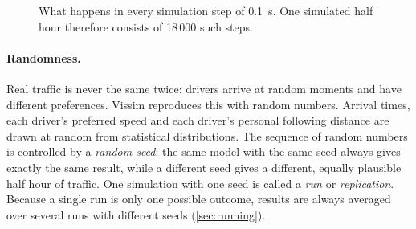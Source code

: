 \documentclass[11pt,a4paper]{article}
\begin{document}
\begin{figure}[!htb]
\centering
{}
\caption[What happens in every simulation step]{What happens in every simulation step of 0.1~s.
One simulated half hour therefore consists of 18\,000 such steps.}
\label{fig:loop}
\end{figure}

\paragraph{Randomness.} Real traffic is never the same twice: drivers arrive at random moments and
have different preferences. Vissim reproduces this with random numbers. Arrival times, each
driver's preferred speed and each driver's personal following distance are drawn at random from
statistical distributions. The sequence of random numbers is controlled by a \emph{random seed}:
the same model with the same seed always gives exactly the same result, while a different seed
gives a different, equally plausible half hour of traffic. One simulation with one seed is called
a \emph{run} or \emph{replication}. Because a single run is only one possible outcome, results
are always averaged over several runs with different seeds (\cref{sec:running}).
\end{document}
